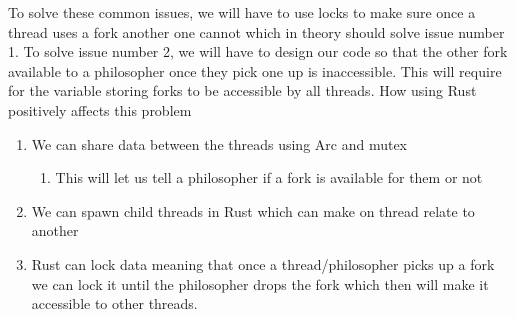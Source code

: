 \documentclass[conference]{IEEEtran}
\begin{document}
	To solve these common issues, we will have to use locks to make sure once a thread uses a fork another one cannot which in theory should solve issue number 1. To solve issue number 2, we will have to design our code so that the other fork available to a philosopher once they pick one up is inaccessible. This will require for the variable storing forks to be accessible by all threads.
	\linebreak
	\linebreak
	How using Rust positively affects this problem
	\begin{enumerate}
		\item We can share data between the threads using Arc and mutex
		\begin{enumerate}
			
			\item This will let us tell a philosopher if a fork is available for them or not
		\end{enumerate}
		\item We can spawn child threads in Rust which can make on thread relate to another
		\item Rust can lock data meaning that once a thread/philosopher picks up a fork we can lock it until the philosopher drops the fork which then will make it accessible to other threads.
	\end{enumerate}
\end{document}
